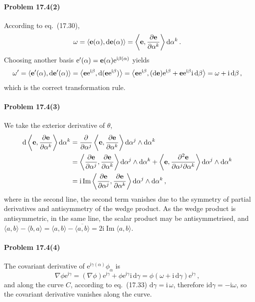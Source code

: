 \documentclass[a4paper,12pt]{article}
\def\d{\mathrm{d}}
\def\e{\mathrm{e}}
\def\imagi{\mathrm{i}}
\renewcommand\Im{\mathop{\text{Im}}}
\newcommand{\problem}[1]{\paragraph{Problem #1}}
\begin{document}

\problem{17.4(2)} According to eq.\ (17.30),
\[
 \omega = \langle {\bf e}(\alpha), \d {\bf e}(\alpha)\rangle = \left\langle {\bf e}, \frac{\partial\bf e}{\partial \alpha^k}\right\rangle \d\alpha^k\,.
\]
Choosing another basis $\e'(\alpha) = {\bf e}(\alpha)\e^{\imagi \beta(\alpha)}$ yields
\[
 \omega' = \langle {\bf e}'(\alpha), \d {\bf e}'(\alpha)\rangle = \left\langle {\bf e}\e^{\imagi\beta}, \d ({\bf e}\e^{\imagi\beta})\right\rangle = \left\langle {\bf e}\e^{\imagi\beta}, (\d{\bf e})\e^{\imagi\beta}+{\bf e}\e^{\imagi\beta}\imagi\,\d\beta\right\rangle =\omega + \imagi\,\d\beta\,, 
\]
which is the correct transformation rule.


\problem{17.4(3)} We take the exterior derivative of $\theta$,
\[\begin{aligned}
 \d \left\langle {\bf e}, \frac{\partial {\bf e}}{\partial \alpha^k}\right\rangle\d\alpha^k &= \frac{\partial}{\partial \alpha^j}\left\langle {\bf e}, \frac{\partial {\bf e}}{\partial \alpha^k}\right\rangle\d\alpha^j\wedge\d\alpha^k\\
 &= \left\langle \frac{\partial{\bf e}}{\partial \alpha^j}, \frac{\partial {\bf e}}{\partial \alpha^k}\right\rangle\d\alpha^j\wedge\d\alpha^k + \left\langle {\bf e}, \frac{\partial^2 {\bf e}}{\partial\alpha^j\partial \alpha^k}\right\rangle\d\alpha^j\wedge\d\alpha^k\\
 &= \imagi \Im \left\langle \frac{\partial{\bf e}}{\partial \alpha^j}, \frac{\partial {\bf e}}{\partial \alpha^k}\right\rangle\d\alpha^j\wedge\d\alpha^k\,,
\end{aligned}\]
where in the second line, the second term vanishes due to the symmetry of partial derivatives and antisymmetry of the wedge product. As the wedge product is antisymmetric, in the same line, the scalar product may be antisymmetrised, and $\langle a, b \rangle - \langle b, a\rangle = \langle a, b \rangle - \overline{\langle a, b\rangle} = 2\imagi \Im \langle a, b\rangle$.


\problem{17.4(4)} The covariant derivative of $\e^{\imagi \gamma(\alpha)}\phi_\alpha$ is
\[
 \nabla \phi\e^{\imagi\gamma} = (\nabla\phi)\e^{\imagi \gamma}+\phi \e^{\imagi\gamma}\imagi\,\d\gamma = \phi(\omega + \imagi\,\d\gamma)\e^{\imagi\gamma}\,,
\]
and along the curve $C$, according to eq.\ (17.33) $\d\gamma=\imagi\,\omega$, therefore $\imagi\d\gamma = -\imagi \omega$, so the covariant derivative vanishes along the curve.
\end{document}
